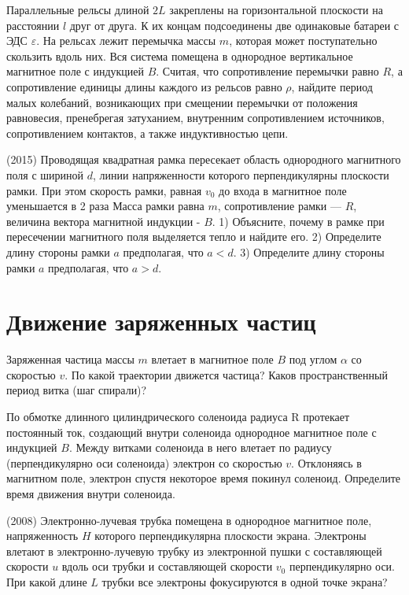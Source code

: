 \AddProb Параллельные рельсы длиной $2L$ закреплены на горизонтальной плоскости на расстоянии $l$ друг от друга. 
К их концам подсоединены две одинаковые батареи с ЭДС {\Large $\varepsilon$}. На рельсах лежит перемычка массы $m$, 
которая может поступательно скользить вдоль них. Вся система помещена в однородное вертикальное магнитное поле с индукцией $B$. 
Считая, что сопротивление перемычки равно $R$, а сопротивление единицы длины каждого из рельсов равно $\rho$, найдите период малых колебаний, 
возникающих при смещении перемычки от положения равновесия, пренебрегая затуханием, внутренним сопротивлением источников, 
сопротивлением контактов, а также индуктивностью цепи.

\AddProb (2015) Проводящая квадратная рамка пересекает область однородного магнитного поля с шириной $d$, линии напряженности которого перпендикулярны плоскости рамки. При этом скорость рамки, равная $v_0$ до входа в магнитное поле уменьшается в 2 раза Масса рамки равна $m$, сопротивление рамки — $R$, величина вектора магнитной индукции - $B$. 1) Объясните, почему в рамке при пересечении магнитного поля выделяется тепло и найдите его. 2) Определите длину стороны рамки $a$ предполагая, что $a<d$. 3) Определите длину стороны рамки $a$ предполагая, что $a>d$.

\section{Движение заряженных частиц}

\AddProb Заряженная частица массы $m$ влетает в магнитное поле $B$ под углом $\alpha$ со скоростью $v$. По какой траектории движется частица? Каков пространственный период витка (шаг спирали)?

\AddProb По обмотке длинного цилиндрического соленоида радиуса R протекает постоянный ток, создающий внутри соленоида однородное магнитное поле с индукцией $B$. Между витками соленоида в него влетает по радиусу (перпендикулярно оси соленоида) электрон со скоростью $v$. Отклоняясь в магнитном поле, электрон спустя некоторое время покинул соленоид. Определите время движения внутри соленоида.

\AddProb (2008) Электронно-лучевая трубка помещена в однородное магнитное поле, напряженность $H$ которого перпендикулярна плоскости экрана. Электроны влетают в электронно-лучевую трубку из электронной пушки с составляющей скорости $u$ вдоль оси трубки и составляющей скорости $v_0$ перпендикулярно оси. При какой длине $L$ трубки все электроны фокусируются в одной точке экрана?

